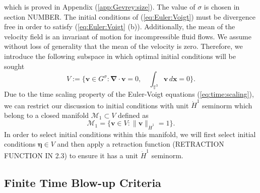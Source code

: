 \documentclass[12pt]{article}
\def\hdo{\dot{H}^1}
\def\v{\boldsymbol v}
\def\x{\boldsymbol x}
\def\be{\boldsymbol \eta}
\def\M{\mathcal{M}}
\numberwithin{equation}{section}
\begin{document}
which is proved in Appendix (\ref{app:Gevrey:size}). The value of $\sigma$ is chosen in section NUMBER. The initial conditions of (\ref{eq:Euler:Voigt}) must be divergence free in order to satisfy (\ref{eq:Euler:Voigt} (b)). Additionally, the mean of the velocity field is an invariant of motion for incompressible fluid flows. We assume without loss of generality that the mean of the velocity is zero. Therefore, we introduce the following subspace in which optimal initial conditions will be sought
\begin{equation}
V := \{\boldsymbol v \in G^\sigma : \boldsymbol \nabla \cdot \boldsymbol v = 0, \quad \int_{\mathbb{T}^3}\boldsymbol v\, d\x = 0\}.
\end{equation}
Due to the time scaling property of the Euler-Voigt equations (\ref{eq:time:scaling}), we can restrict our discussion to initial conditions with unit $\dot{H}^1$ seminorm which belong to a closed manifold $\M_1\subset V$ defined as
\begin{equation}
\M_1 = \{\v \in V : \|\v\|_{\hdo} = 1 \}.
\end{equation}
In order to select initial conditions within this manifold, we will first select initial conditions $\be\in V$ and then apply a retraction function (RETRACTION FUNCTION IN 2.3) to ensure it has a unit $\dot{H}^1$ seminorm.


\subsection{Finite Time Blow-up Criteria}
\end{document}
